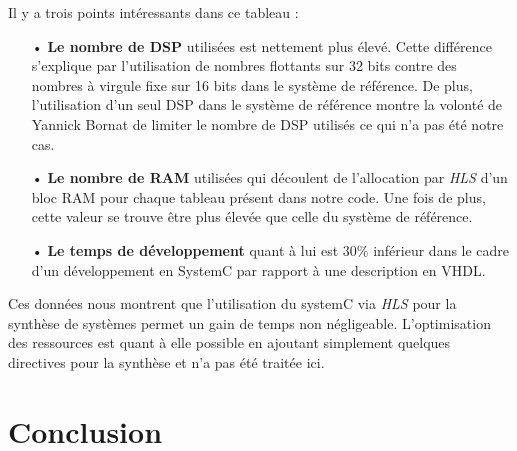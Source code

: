 \documentclass[a4paper,12pt]{article}
\begin{document}
	Il y a trois points intéressants dans ce tableau :
\begin{itemize}
	\item[•] \textbf{Le nombre de DSP} utilisées est nettement plus élevé. Cette différence s'explique par l'utilisation de nombres flottants sur 32 bits contre des nombres à virgule fixe sur 16 bits dans le système de référence. De plus, l'utilisation d'un seul DSP dans le système de référence montre la volonté de Yannick Bornat de limiter le nombre de DSP utilisés ce qui n'a pas été notre cas.
	\item[•] \textbf{Le nombre de RAM} utilisées qui découlent de l'allocation par \textit{HLS} d'un bloc RAM pour chaque tableau présent dans notre code. Une fois de plus, cette valeur se trouve être plus élevée que celle du système de référence.
	\item[•] \textbf{Le temps de développement} quant à lui est $30\%$ inférieur dans le cadre d'un développement en SystemC par rapport à une description en VHDL.
\end{itemize}

Ces données nous montrent que l'utilisation du systemC via \textit{HLS} pour la synthèse de systèmes permet un gain de temps non négligeable. L'optimisation des ressources est quant à elle possible en ajoutant simplement quelques directives pour la synthèse et n'a pas été traitée ici. 
\newpage
\section{Conclusion}
\end{document}
